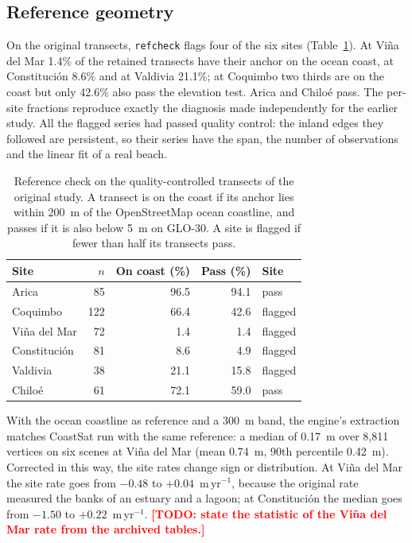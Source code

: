 \documentclass[authoryear,preprint,review,12pt]{elsarticle}
\newcommand{\todo}[1]{\textcolor{red}{\textbf{[TODO: #1]}}}
\begin{document}
\subsection{Reference geometry}\label{subsec:res_reference}
On the original transects, \texttt{refcheck} flags four of the six sites
(Table~\ref{tab:refcheck}). At Vi\~na del Mar 1.4\% of the retained transects
have their anchor on the ocean coast, at Constituci\'on 8.6\% and at Valdivia
21.1\%; at Coquimbo two thirds are on the coast but only 42.6\% also pass the
elevation test. Arica and Chilo\'e pass. The per-site fractions reproduce
exactly the diagnosis made independently for the earlier study. All the
flagged series had passed quality control: the inland edges they followed are
persistent, so their series have the span, the number of observations and the
linear fit of a real beach.

\begin{table}[t]
  \centering
  \small
  \caption{Reference check on the quality-controlled transects of the original
  study. A transect is on the coast if its anchor lies within 200~m of the
  OpenStreetMap ocean coastline, and passes if it is also below 5~m on GLO-30.
  A site is flagged if fewer than half its transects pass.}
  \label{tab:refcheck}
  \begin{tabular}{@{}lrrrl@{}}
    \toprule
    Site & $n$ & On coast (\%) & Pass (\%) & Site \\
    \midrule
    Arica          & 85  & 96.5 & 94.1 & pass \\
    Coquimbo       & 122 & 66.4 & 42.6 & flagged \\
    Vi\~na del Mar & 72  & 1.4  & 1.4  & flagged \\
    Constituci\'on & 81  & 8.6  & 4.9  & flagged \\
    Valdivia       & 38  & 21.1 & 15.8 & flagged \\
    Chilo\'e       & 61  & 72.1 & 59.0 & pass \\
    \bottomrule
  \end{tabular}
\end{table}

With the ocean coastline as reference and a 300~m band, the engine's
extraction matches CoastSat run with the same reference: a median of 0.17~m
over 8,811 vertices on six scenes at Vi\~na del Mar (mean 0.74~m, 90th
percentile 0.42~m). Corrected in this way, the site rates change sign or
distribution. At Vi\~na del Mar the site rate goes from $-0.48$ to
$+0.04$~m\,yr$^{-1}$, because the original rate measured the banks of an
estuary and a lagoon; at Constituci\'on the median goes from $-1.50$ to
$+0.22$~m\,yr$^{-1}$.
\todo{state the statistic of the Vi\~na del Mar rate from the archived
tables.}
\end{document}
